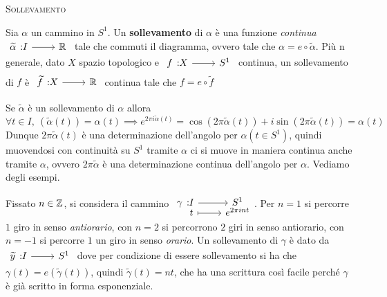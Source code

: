 \begin{define} \textsc{Sollevamento} \\
	\begin{minipage}[t]{0.73\textwidth}
		Sia $\alpha$ un cammino in $S^1$. Un \textbf{sollevamento} di $\alpha$ è una funzione \textit{continua} $\funz {\widetilde{\alpha}} I \realset$ tale che commuti il diagramma, ovvero  tale che $\alpha= e\circ \widetilde{\alpha}$. \newline
		Più n generale, dato $X$ spazio topologico e $\funz f X {S^1}$ continua, un sollevamento di $f$ è $\funz {\widetilde{f}} X \realset$ continua tale che $f=e\circ \widetilde{f}$
	\end{minipage}
	\begin{minipage}[t]{0.13\textwidth}\vspace{-10pt}
	\end{minipage}
\end{define}
Se $\widetilde{\alpha}$ è un sollevamento di $\alpha$ allora
	\begin{equation*}
		\forall t\in I, \ (\widetilde{\alpha}(t))=\alpha(t)\implies e^{2\pi i \widetilde{\alpha}(t)}=\cos(2\pi \widetilde{\alpha}(t))+i\sin(2\pi\widetilde{\alpha}(t))=\alpha(t)
	\end{equation*}
Dunque $2\pi\widetilde{\alpha}(t)$ è una determinazione dell'angolo per $\alpha(t\in S^1)$, quindi muovendosi con continuità su $S^1$ tramite $\alpha$ ci si muove in maniera continua anche tramite $\alpha$, ovvero $2\pi\widetilde{\alpha}$ è una determinazione continua dell'angolo per $\alpha$.\newline
Vediamo degli esempi.
\begin{examples}
	Fissato $n\in\mathbb{Z}$, si considera il cammino $\funztot \gamma I {S^1} t {e^{2\pi i nt}}$. Per $n=1$ si percorre $1$ giro in senso \textit{antiorario}, con $n=2$ si percorrono $2$ giri in senso antiorario, con $n=-1$ si percorre $1$ un giro in senso \textit{orario}.\newline 
	Un sollevamento di $\gamma$ è dato da $\funz {\widetilde{y}} I {S^1}$ dove per condizione di essere sollevamento si ha che $\gamma(t)=e(\widetilde{\gamma}(t))$, quindi $\widetilde{\gamma}(t)=nt$, che ha una scrittura così facile perché $\gamma$ è già scritto in forma esponenziale.
\end{examples}
